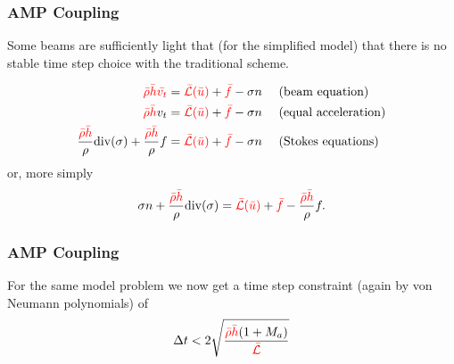 \documentclass[8pt]{beamer}
\newcommand{\leftd}[1]{{\color{red} \bar{#1}}}
\newcommand{\leftdd}[2]{{\color{red} \bar{#1}(\bar{#2})}}
\newcommand{\divergence}{\mathrm{div}}
\begin{document}
\begin{frame}
    \frametitle{AMP Coupling}
    Some beams are sufficiently light that (for the simplified model) that there
    is no stable time step choice with the traditional scheme.

    \begin{align}
        \leftd{\rho} \leftd{h} \leftd{v_t}
        &= \leftdd{\mathcal{L}}{u} + \leftd{f} - \sigma n
        \quad \text{ (beam equation)}                                         \\
        \leftd{\rho} \leftd{h} v_t
        &= \leftdd{\mathcal{L}}{u} + \leftd{f} - \sigma n
        \quad \text{ (equal acceleration)}                                    \\
        \dfrac{\leftd{\rho} \leftd{h}}{\rho} \divergence(\sigma)
        + \dfrac{\leftd{\rho} \leftd{h}}{\rho} f
        &= \leftdd{\mathcal{L}}{u} + \leftd{f} - \sigma n
        \quad \text{ (Stokes equations)}
    \end{align}
    or, more simply
    \begin{equation}
        \sigma n + \dfrac{\leftd{\rho} \leftd{h}}{\rho} \divergence(\sigma)
        = \leftdd{\mathcal{L}}{u}
        + \leftd{f}
        - \dfrac{\leftd{\rho} \leftd{h}}{\rho} f.
    \end{equation}
\end{frame}

\begin{frame}
    \frametitle{AMP Coupling}
    For the same model problem we now get a time step constraint (again by von
    Neumann polynomials) of
    \begin{equation}
        \Delta t < 2
        \sqrt{\dfrac{\leftd{\rho} \leftd{h} (1 + M_a)}{\leftd{\mathcal{L}}}}
    \end{equation}
\end{frame}
\end{document}
